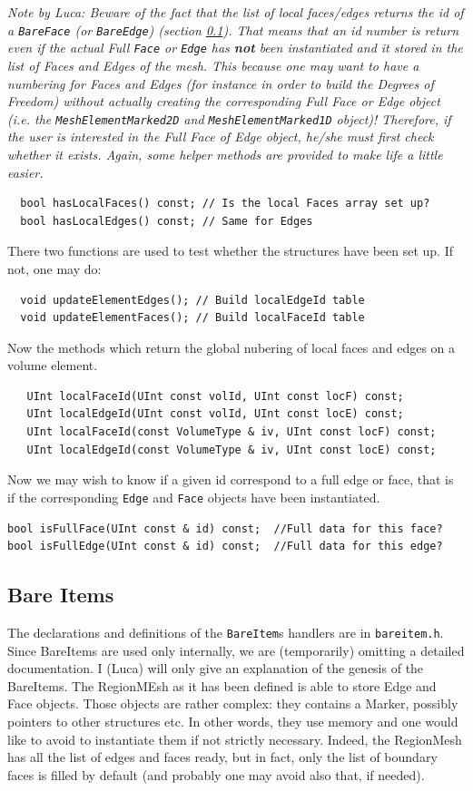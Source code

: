   \textsl{Note by Luca: Beware of the fact that the list of local
  faces/edges returns the id of a \texttt{BareFace} (or
  \texttt{BareEdge}) (section \ref{sec:bareentities}). That means that
  an id number is return even if the actual Full \texttt{Face} or
  \texttt{Edge} has \textbf{not} been instantiated and it stored in the
  list of Faces and Edges of the mesh.  This because one may want to
  have a numbering for Faces and Edges (for instance in order to build
  the Degrees of Freedom) without actually creating the corresponding
Full Face or Edge object (i.e. the \texttt{MeshElementMarked2D} and
\texttt{MeshElementMarked1D} object)! Therefore, if the user is interested in
the Full Face of Edge object, he/she must first check whether it exists.
Again, some helper methods are provided to make life a little easier.}

\begin{verbatim}
  bool hasLocalFaces() const; // Is the local Faces array set up?
  bool hasLocalEdges() const; // Same for Edges
\end{verbatim}
There two functions are used to test whether the structures have been set 
up. If not, one may do:
\begin{verbatim}
  void updateElementEdges(); // Build localEdgeId table
  void updateElementFaces(); // Build localFaceId table
\end{verbatim}
Now the methods which return the global nubering of
local faces and edges on a volume element.
\begin{verbatim}
   UInt localFaceId(UInt const volId, UInt const locF) const;
   UInt localEdgeId(UInt const volId, UInt const locE) const;
   UInt localFaceId(const VolumeType & iv, UInt const locF) const;
   UInt localEdgeId(const VolumeType & iv, UInt const locE) const;
\end{verbatim}
Now we may wish to know if a given id correspond to a full edge or
face, that is if the corresponding \texttt{Edge} and \texttt{Face}
objects have been instantiated. 

\begin{verbatim}
bool isFullFace(UInt const & id) const;  //Full data for this face?
bool isFullEdge(UInt const & id) const;  //Full data for this edge?
\end{verbatim}
\subsection{Bare Items}\label{sec:bareentities}
The declarations and definitions of the \texttt{BareItem}s handlers are in
\texttt{bareitem.h}. Since BareItems are used only internally, we are
(temporarily) omitting a detailed documentation. I (Luca) will only
give an explanation of the genesis of the BareItems. The RegionMEsh as
it has been defined is able to store Edge and Face objects. Those
objects are rather complex: they contains a Marker, possibly pointers
to other structures etc. In other words, they use memory and one would
like to avoid to instantiate them if not strictly necessary. Indeed,
the RegionMesh has all the list of edges and faces ready, but in fact,
only the list of boundary faces is filled by default (and probably one
may avoid also that, if needed). 

